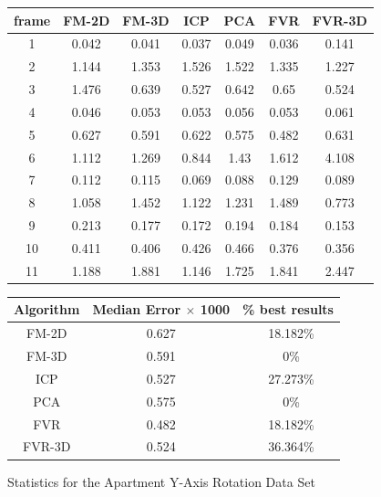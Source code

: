 

\begin{figure}
\centering
\begin{tabular}{ccccccc}
\hline
\textbf{frame} & \textbf{FM-2D} & \textbf{FM-3D} & \textbf{ICP} & \textbf{PCA} & \textbf{FVR} & \textbf{FVR-3D}
\\ \hline
1 & 0.042&0.041&0.037&0.049&0.036&0.141\\
2 & 1.144&1.353&1.526&1.522&1.335&1.227\\
3 & 1.476&0.639&0.527&0.642&0.65&0.524\\
4 & 0.046&0.053&0.053&0.056&0.053&0.061\\
5 & 0.627&0.591&0.622&0.575&0.482&0.631\\
6 & 1.112&1.269&0.844&1.43&1.612&4.108\\
7 & 0.112&0.115&0.069&0.088&0.129&0.089\\
8 & 1.058&1.452&1.122&1.231&1.489&0.773\\
9 & 0.213&0.177&0.172&0.194&0.184&0.153\\
10 & 0.411&0.406&0.426&0.466&0.376&0.356\\
11 & 1.188&1.881&1.146&1.725&1.841&2.447\\
\end{tabular}

\vspace{10mm}
\centering
\begin{tabular}{ccc}
\hline
\textbf{Algorithm} & \textbf{Median Error $\times$ 1000} & \textbf{\% best results}\\ \hline
FM-2D	& 0.627 & ~18.182\%\\
FM-3D	& 0.591 & ~0\%\\
ICP	& 0.527 & ~27.273\%\\
PCA	& 0.575 & ~0\%\\
FVR	& 0.482 & ~18.182\%\\
FVR-3D	& 0.524 & ~36.364\%\\
\end{tabular}

\caption{Statistics for the Apartment Y-Axis Rotation Data Set}
\label{tab:PET0ST}
\end{figure} 




